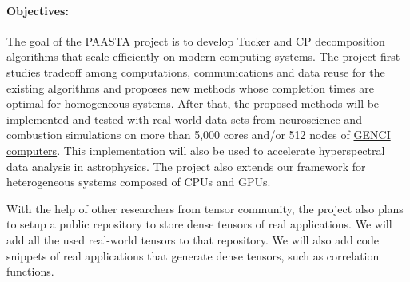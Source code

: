 \documentclass[a4paper,11pt, margin=2cm]{article}
\newcommand{\bora}[1]{{\color{magenta} \emph{#1}}}
\begin{document}
%	
	
	
	\vspace*{-0.35cm}\paragraph{Objectives:} The goal of the PAASTA project is to develop Tucker and CP decomposition algorithms that scale efficiently on modern computing systems.
	The project first studies tradeoff among computations, communications and data reuse for the existing algorithms and proposes new methods whose completion times are optimal for homogeneous systems. After that, the proposed methods will be implemented and tested with real-world data-sets from neuroscience and combustion simulations on  more than 5,000 cores and/or 512 nodes of \href{https://www.genci.fr/en/services/means-calculation}{GENCI computers}. This implementation will also be used to accelerate hyperspectral data analysis in astrophysics.
	The project also extends our framework for heterogeneous systems composed of CPUs and GPUs.
	
	With the help of other researchers from tensor community, the project also plans to setup a public repository to store dense tensors of real applications. We will add all the used real-world tensors to that repository. We will also add code snippets of real applications that generate dense tensors, such as correlation functions.
	
\end{document}
